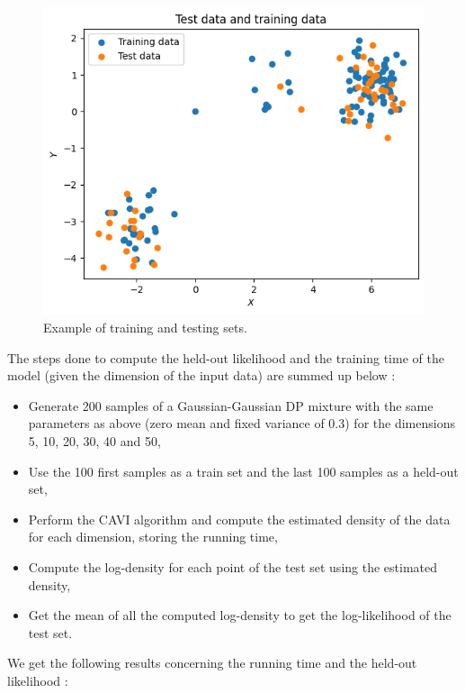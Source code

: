 \documentclass{article}
\begin{document}
\begin{figure}[H]
    \centering
    \includegraphics[scale=0.4]{images/held-out_set.png}
    \caption{Example of training and testing sets.}
\end{figure}


The steps done to compute the held-out likelihood and the training time of the model (given the dimension of the input data) are summed up below :

\begin{itemize}
    \item Generate 200 samples of a Gaussian-Gaussian DP mixture with the same parameters as above (zero mean and fixed variance of 0.3) for the dimensions 5, 10, 20, 30, 40 and 50,
    \item Use the 100 first samples as a train set and the last 100 samples as a held-out set,
    \item Perform the CAVI algorithm and compute the estimated density of the data for each dimension, storing the running time,
    \item Compute the log-density for each point of the test set using the estimated density,
    \item Get the mean of all the computed log-density to get the log-likelihood of the test set.
\end{itemize}

We get the following results concerning the running time and the held-out likelihood :
\end{document}
